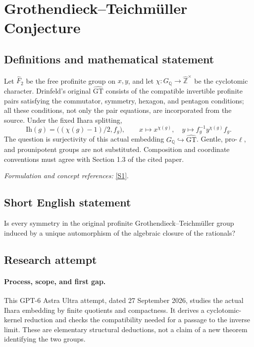 \documentclass[11pt]{article}
\begin{document}
\section*{\texorpdfstring{Grothendieck–Teichmüller Conjecture}{Grothendieck–Teichmüller Conjecture}}\label{statement}
\subsection{Definitions and mathematical statement}
Let $\widehat F_2$ be the free profinite group on $x,y$, and let $\chi:G_{{\mathbb{Q}}}\to\widehat{{\mathbb{Z}}}^\times$ be the cyclotomic character. Drinfeld's original $\widehat{\mathrm{GT}}$ consists of the compatible invertible profinite pairs satisfying the commutator, symmetry, hexagon, and pentagon conditions; all these conditions, not only the pair equations, are incorporated from the source. Under the fixed Ihara splitting,
\[
 \mathrm{Ih}(g)=\bigl((\chi(g)-1)/2,f_g\bigr),\qquad
 x\mapsto x^{\chi(g)},\quad y\mapsto f_g^{-1}y^{\chi(g)}f_g.
\]
The question is surjectivity of this actual embedding $G_{{\mathbb{Q}}}\hookrightarrow\widehat{\mathrm{GT}}$. Gentle, pro-$\ell$, and prounipotent groups are not substituted. Composition and coordinate conventions must agree with Section 1.3 of the cited paper.
\par\smallskip\textit{Formulation and concept references:} \href{https://arxiv.org/pdf/2405.11725v3}{[S1]}.

\subsection{Short English statement}
Is every symmetry in the original profinite Grothendieck--Teichmüller group induced by a unique automorphism of the algebraic closure of the rationals?
\subsection{Research attempt}
\paragraph{Process, scope, and first gap.}
This GPT-6 Astra Ultra attempt, dated 27 September 2026, studies the actual Ihara embedding by finite quotients and compactness. It derives a cyclotomic-kernel reduction and checks the compatibility needed for a passage to the inverse limit. These are elementary structural deductions, not a claim of a new theorem identifying the two groups.
\end{document}
